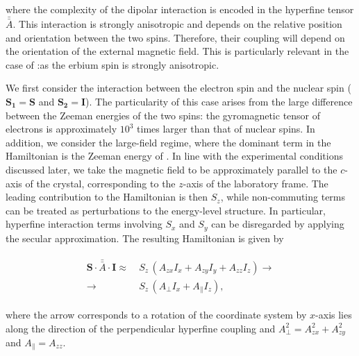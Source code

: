 \noindent where the complexity of the dipolar interaction is encoded in the hyperfine tensor $\bar{\bar{A}}$. This interaction is strongly anisotropic and depends on the relative position and orientation between the two spins. Therefore, their coupling will depend on the orientation of the external magnetic field. This is particularly relevant in the case of \Er:\Ca as the erbium spin is strongly anisotropic. 

We first consider the interaction between the \Er electron spin and the \W nuclear spin ($\mathbf{S_1}=\mathbf{S}$ and $\mathbf{S_2}=\mathbf{I}$). The particularity of this case arises from the large difference between the Zeeman energies of the two spins: the gyromagnetic tensor of electrons is approximately $10^3$ times larger than that of nuclear spins. In addition, we consider the large-field regime, where the dominant term in the Hamiltonian is the Zeeman energy of \Er. In line with the experimental conditions discussed later, we take the magnetic field to be approximately parallel to the $c$-axis of the crystal, corresponding to the $z$-axis of the laboratory frame. The leading contribution to the Hamiltonian is then $S_z$, while non-commuting terms can be treated as perturbations to the energy-level structure. In particular, hyperfine interaction terms involving $S_x$ and $S_y$ can be disregarded by applying the secular approximation. The resulting Hamiltonian is given by

\begin{align}
\begin{split}
    \mathbf{S}\cdot\bar{\bar{A}}\cdot\mathbf{I} \approx&\ S_z\,\left(A_{zx}I_x+A_{zy}I_y+A_{zz}I_z\right) \rightarrow \\
    \rightarrow &\ S_z \, \left(A_\perp I_x + A_\parallel I_z\right),
\end{split}
\end{align}

\noindent where the arrow corresponds to a rotation of the coordinate system by $x$-axis lies along the direction of the perpendicular hyperfine coupling and $A_\perp^2 = A_{zx}^2+A_{zy}^2$ and $A_\parallel = A_{zz}$.

